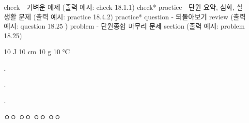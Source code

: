 





check - 가벼운 예제 (출력 예시: check 18.1.1)
check* 
practice - 단원 요약, 심화, 실생활 문제 (출력 예시: practice 18.4.2)
practice*
question - 되돌아보기 review (출력 예시: question 18.25 )
problem - 단원종합 마무리 문제 section (출력 예시: problem 18.25)





10 J 		
10 cm		
10 g		
10 °C       







                    {
\begin{problembox}{\thechapter. \ProblemNumberumber}


\end{problembox}

\begin{problembox}{\thechapter. \ProblemNumberumber}


\end{problembox}

\begin{solbox}{\thechapter. \ProblemNumberumber}
\bnset
{}


\bn \zzz

\bnset
{}
\bn \zzz

\bnset
{}
\bn \zzz

 ㅇㅇ \zzz
{} ㅇㅇ \zzz
{} ㅇㅇ \zzz
{} ㅇㅇ
\end{solbox}
\clearpage}





